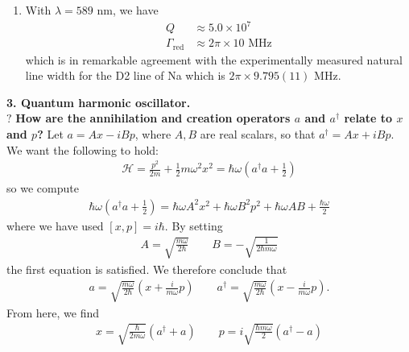 \documentclass{article}
\theoremstyle{definition}
\newcommand{\ham}{\mathcal{H}}
\newcommand{\f}[2]{\frac{#1}{#2}}
\newcommand{\lp}{\left(}
\newcommand{\rp}{\right)}
\begin{document}
\begin{enumerate}[label=\alph*)]
	\item With $\lambda = 589 $ nm, we have
	\begin{align*}
	Q &\approx 5.0 \times 10^7 \\
	\Gamma_\text{red} &\approx 2\pi \times 10 \text{ MHz}
	\end{align*}
	which is in remarkable agreement with the experimentally measured natural line width for the D2 line of Na which is $2\pi \times 9.795(11)$ MHz. 
\end{enumerate}






\noindent \textbf{3. Quantum harmonic oscillator.} \\


\noindent $\boxed{\textbf{?}}$ \textbf{How are the annihilation and creation operators $ a$ and $ a^\dagger$ relate to $ x$ and $ p$?} Let $a = A  x - i B  p$, where $A,B$ are real scalars, so that $ a^\dagger = A x+ i B  p$. We want the following to hold:
\begin{align*}
\ham = \f{p^2 }{2m} + \f{1}{2}m\omega^2 x^2 = \hbar \omega \lp a^\dagger a + \f{1}{2} \rp
\end{align*}
so we compute
\begin{align*}
\hbar \omega \lp a^\dagger a+ \f{1}{2}\rp = \hbar \omega A^2 x^2 + \hbar \omega B^2 p^2 + \hbar \omega AB + \f{\hbar \omega}{2}
\end{align*}
where we have used $[x,p] = i\hbar $. By setting 
\begin{align*}
A = \sqrt{\f{m\omega}{2\hbar}} \quad\quad B = -\sqrt{\f{1}{2\hbar m\omega}}
\end{align*}
the first equation is satisfied. We therefore conclude that
\begin{align*}
a = \sqrt{\f{m\omega}{2\hbar}} \lp x + \f{i}{m\omega} p \rp \quad\quad a^\dagger = \sqrt{\f{m\omega}{2\hbar}} \lp x - \f{i}{m\omega} p \rp.
\end{align*}
From here, we find 
\begin{align*}
x = \sqrt{\f{\hbar}{2 m\omega}}(a^\dagger + a) \quad\quad p = i\sqrt{\f{\hbar m\omega }{2}}(a^\dagger - a)
\end{align*}
\end{document}
